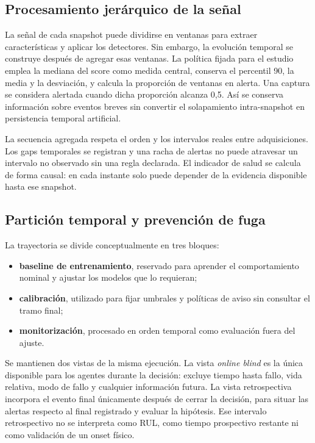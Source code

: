 \subsection{Procesamiento jerárquico de la señal}

La señal de cada snapshot puede dividirse en ventanas para extraer
características y aplicar los detectores. Sin embargo, la evolución temporal se
construye después de agregar esas ventanas. La política fijada para el estudio
emplea la mediana del score como medida central, conserva el percentil 90, la
media y la desviación, y calcula la proporción de ventanas en alerta. Una
captura se considera alertada cuando dicha proporción alcanza 0,5. Así se
conserva información sobre eventos breves sin convertir el solapamiento
intra-snapshot en persistencia temporal artificial.

La secuencia agregada respeta el orden y los intervalos reales entre
adquisiciones. Los gaps temporales se registran y una racha de alertas no puede
atravesar un intervalo no observado sin una regla declarada. El indicador de
salud se calcula de forma causal: en cada instante solo puede depender de la
evidencia disponible hasta ese snapshot.

\subsection{Partición temporal y prevención de fuga}

La trayectoria se divide conceptualmente en tres bloques:

\begin{itemize}
  \item \textbf{baseline de entrenamiento}, reservado para aprender el
        comportamiento nominal y ajustar los modelos que lo requieran;
  \item \textbf{calibración}, utilizado para fijar umbrales y políticas de
        aviso sin consultar el tramo final;
  \item \textbf{monitorización}, procesado en orden temporal como evaluación
        fuera del ajuste.
\end{itemize}

Se mantienen dos vistas de la misma ejecución. La vista \textit{online blind}
es la única disponible para los agentes durante la decisión: excluye tiempo
hasta fallo, vida relativa, modo de fallo y cualquier información futura. La
vista retrospectiva incorpora el evento final únicamente después de cerrar la
decisión, para situar las alertas respecto al final registrado y evaluar la
hipótesis. Ese intervalo retrospectivo no se interpreta como RUL, como tiempo
prospectivo restante ni como validación de un onset físico.


